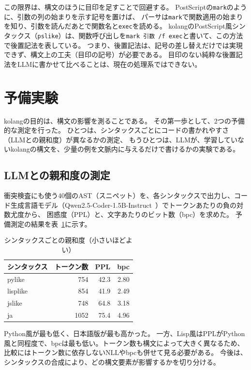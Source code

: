 \documentclass{ipsjprosym}
\begin{document}
この限界は、構文のほうに目印を足すことで回避する。
PostScriptの\verb|mark|のように、引数の列の始まりを示す記号を置けば、
パーサは\verb|mark|で関数適用の始まりを知り、引数を読んだあとで関数名と\verb|exec|を読める。
kolangのPostScript風シンタックス（\verb|pslike|）は、関数呼び出しを\verb|mark 引数 /f exec|と書いて、この方法で後置記法を表している。
つまり、後置記法は、記号の差し替えだけでは実現できず、構文上の工夫（目印の記号）が必要である。
目印のない純粋な後置記法をLLMに書かせて比べることは、現在の処理系ではできない。


\section{予備実験}
\label{sec:eval}

kolangの目的は、構文の影響を測ることである。
その第一歩として、2つの予備的な測定を行った。
ひとつは、シンタックスごとにコードの書かれやすさ（LLMとの親和度）が異なるかの測定、
もうひとつは、LLMが、学習していないkolangの構文を、少量の例を文脈内に与えるだけで書けるかの実験である。

\subsection{LLMとの親和度の測定}

衝突検査にも使う40個のAST（スニペット）を、各シンタックスで出力し、コード生成言語モデル（Qwen2.5-Coder-1.5B-Instruct~\cite{Hui2024Qwen25Coder}）でトークンあたりの負の対数尤度から、
困惑度（PPL）\cite{Hindle2012Naturalness}と、文字あたりのビット数（bpc）を求めた。
予備測定の結果を表~\ref{tab:ppl}に示す。

\begin{table}[t]
\centering
\caption{シンタックスごとの親和度（小さいほどよい）}
\label{tab:ppl}
\begin{tabular}{lrrr}
\hline
シンタックス & トークン数 & PPL & bpc \\
\hline
pylike   &  754 & 42.3 & 2.80 \\
lisplike &  854 & 41.9 & 2.49 \\
jslike   &  748 & 64.8 & 3.18 \\
ja       & 1052 & 75.4 & 4.96 \\
\hline
\end{tabular}
\end{table}

Python風が最も低く、日本語版が最も高かった。
一方、Lisp風はPPLがPython風と同程度で、bpcは最も低い。トークン数も構文によって大きく異なるため、比較にはトークン数に依存しないNLLやbpcも併せて見る必要がある。
今後は、シンタックスの合成により、どの構文要素が影響するかを切り分ける。
\end{document}
